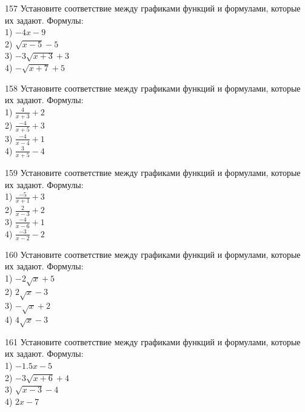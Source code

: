 \documentclass[4apaper]{article}
\begin{document}
\begin{taskBN}{157}
Установите соответствие между графиками функций и формулами, которые их задают. Формулы: \\1) $-4x-9$\\2) $\sqrt{x-5}-5$\\3) $-3\sqrt{x+3}+3$\\4) $-\sqrt{x+7}+5$
\end{taskBN}

\begin{taskBN}{158}
Установите соответствие между графиками функций и формулами, которые их задают. Формулы: \\1) $\frac{4}{x+3}+2$\\2) $\frac{-4}{x+5}+3$\\3) $\frac{-4}{x-4}+1$\\4) $\frac{3}{x+5}-4$
\end{taskBN}

\begin{taskBN}{159}
Установите соответствие между графиками функций и формулами, которые их задают. Формулы: \\1) $\frac{-5}{x+1}+3$\\2) $\frac{2}{x-3}+2$\\3) $\frac{-4}{x-6}+1$\\4) $\frac{-3}{x-2}-2$
\end{taskBN}

\begin{taskBN}{160}
Установите соответствие между графиками функций и формулами, которые их задают. Формулы: \\1) $-2\sqrt{x}+5$\\2) $2\sqrt{x}-3$\\3) $-\sqrt{x}+2$\\4) $4\sqrt{x}-3$
\end{taskBN}

\begin{taskBN}{161}
Установите соответствие между графиками функций и формулами, которые их задают. Формулы: \\1) $-1.5x-5$\\2) $-3\sqrt{x+6}+4$\\3) $\sqrt{x-3}-4$\\4) $2x-7$
\end{taskBN}
\end{document}
